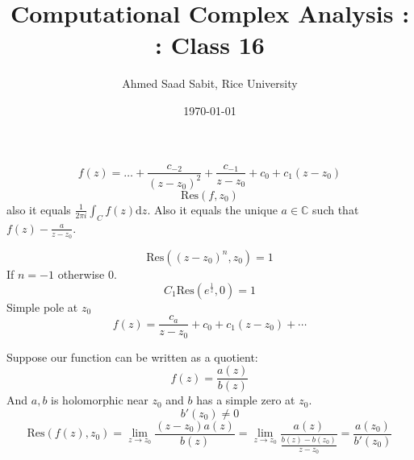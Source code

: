 \documentclass[letter]{article}
\title{Computational Complex Analysis : : Class 16}
\author{Ahmed Saad Sabit, Rice University}
\date{\today}
\begin{document}
\maketitle

\[
f(z ) = 
\ldots 
+ 
\frac{c_{-2} }{(z-z_0)^2} + \frac{c_{-1}}{z-z_0} + c_0 + c_1 (z-z_0)
\] 
\[
\text{Res}(f,z_0)
\] also it equals $\frac{1}{2\pi i} \int_{C} f(z) \mathrm{d} z$. Also it equals the unique $a \in  \mathbb{C}$ such that $f(z) - \frac{a}{z-z_0}$. 

\[
\text{Res} \left(
	(z-z_0)^{n}, z_0 
\right) = 1
\]
If $n = -1$ otherwise $0$. 
\[
C_1 \text{Res} \left(e^{\frac{1}{z}} , 0\right) = 1
\]
Simple pole at $z_0$ 
\[
f(z) = \frac{c_a}{z-z_0} + c_0 + c_1(z-z_0) + \cdots
\]

Suppose our function can be written as a quotient: 
\[
f(z) = \frac{a(z)}{b(z)} 
\] And $a,b$ is holomorphic near $z_0$ and $b$ has a simple zero at $z_0$. \[
b'(z_0) \neq  0 
\] 
\[
\text{Res}(f(z), z_0) = \lim_{z \to z_0} \frac{(z-z_0) a(z)}{b(z)} = \lim_{z \to z_0} \frac{a(z)}{\frac{b(z)-b(z_0)}{z-z_0}} = \frac{a(z_0)}{b'(z_0)}
\] 
\end{document}

